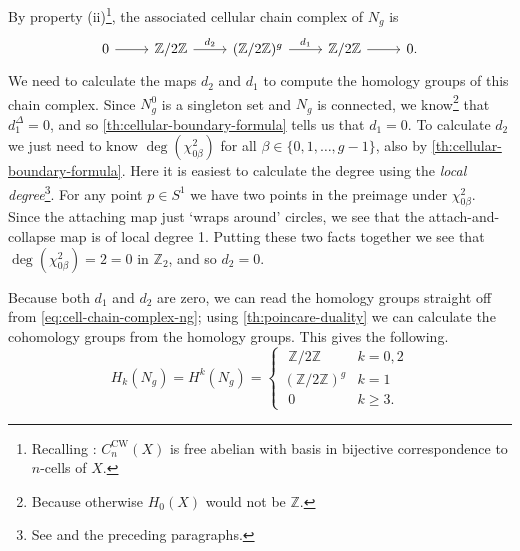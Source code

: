 \documentclass[12pt]{article}
\numberwithin{equation}{subsection}
\numberwithin{theorem}{subsection}
\numberwithin{lemma}{subsection}
\numberwithin{corollary}{subsection}
\numberwithin{definition}{subsection}
\numberwithin{example}{subsection}
\numberwithin{note}{subsection}
\newcommand{\zz}{\mathbb{Z}}
\begin{document}
            \bigskip

            By property (ii)\footnote{
                Recalling \cite[Lemma~2.34,~\S2.2]{hatcher2002algebraic}: $C_n^\text{CW}(X)$ is free abelian with basis in bijective correspondence to $n$-cells of $X$.
            }, the associated cellular chain complex of $N_g$ is
            \begin{equation}\label{eq:cell-chain-complex-ng}
                \begin{tikzcd}
                    0 \arrow{r} & \zz/2\zz \arrow{r}{d_2} & (\zz/2\zz)^g \arrow{r}{d_1} & \zz/2\zz \arrow{r} & 0.
                \end{tikzcd}
            \end{equation}
            We need to calculate the maps $d_2$ and $d_1$ to compute the homology groups of this chain complex.
            Since $N_g^0$ is a singleton set and $N_g$ is connected, we know\footnote{
                Because otherwise $H_0(X)$ would not be $\zz$.
            } that $d_1^\Delta=0$, and so \cref{th:cellular-boundary-formula} tells us that $d_1=0$.
            To calculate $d_2$ we just need to know $\deg(\chi^2_{0\beta})$ for all $\beta\in\{0,1,\ldots,g-1\}$, also by \cref{th:cellular-boundary-formula}.
            Here it is easiest to calculate the degree using the \emph{local degree}\footnote{
                See \cite[Proposition~2.30,~\S2.2]{hatcher2002algebraic} and the preceding paragraphs.
            }.
            For any point $p\in S^1$ we have two points in the preimage under $\chi_{0\beta}^2$.
            Since the attaching map just `wraps around' circles, we see that the attach-and-collapse map is of local degree 1.
            Putting these two facts together we see that $\deg(\chi_{0\beta}^2)=2=0$ in $\zz_2$, and so $d_2=0.$

            Because both $d_1$ and $d_2$ are zero, we can read the homology groups straight off from \cref{eq:cell-chain-complex-ng}; using \cref{th:poincare-duality} we can calculate the cohomology groups from the homology groups.
            This gives the following.
            \begin{equation}\label{eq:co-homology-of-ng}
                H_k(N_g) = H^k(N_g) =
                \begin{cases}
                    \,\,\zz/2\zz & k=0,2\\
                    (\zz/2\zz)^g & k=1\\
                    \,\,0 & k\geqslant3.
                \end{cases}
            \end{equation}
\end{document}
